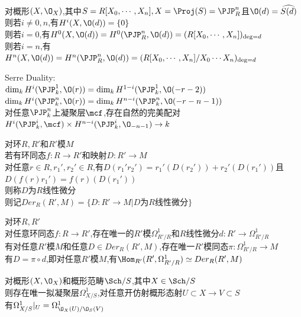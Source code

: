 \begin{dingli}
对概形$(X,\O_{X})$,其中$S=R[X_0,\cdots,X_n],X=\Proj(S)=\PJP^{n}_{R}$且$\O(d)=\widehat{S(d)}$\\
则若$i\neq 0,n$,有$H^{i}(X,\O(d))=\{0\}$\\
则若$i=0$,有$H^{0}(X,\O(d))=H^{0}(\PJP^{n}_{R},\O(d))=(R[X_0,\cdots,X_n])_{\deg=d}$\\
则若$i=n$,有$H^{n}(X,\O(d))=H^{n}(\PJP^{n}_{R},\O(d))=(R[X_0,\cdots,X_n]/X_0\cdots X_n)_{\deg=d}$
\end{dingli}

\begin{dingli}
Serre Duality:\\
$\dim_{k}H^{i}(\PJP^{1}_{k},\O(r))=\dim_{k}H^{1-i}(\PJP^{1}_{k},\O(-r-2))$\\
$\dim_{k}H^{i}(\PJP^{n}_{k},\O(r))=\dim_{k}H^{n-i}(\PJP^{n}_{k},\O(-r-n-1))$\\
对任意$\PJP^{n}_{k}$上凝聚层$\mcf$,存在自然的完美配对$H^{i}(\PJP^{i}_{k},\mcf)\times H^{n-i}(\PJP^{i}_{k},\O_{-n-1})\to k$
\end{dingli}

\begin{dingyi}
对环$R,R'$和$R'$模$M$\\
若有环同态$f:R\to R'$和映射$D:R'\to M$\\
对任意$r\in R,r_1',r_2'\in R$,有$D(r_1'r_2')=r_1'(D(r_2'))+r_2'(D(r_1'))$且$D(f(r)r_1')=f(r)(D(r_1'))$\\
则称$D$为$R$线性微分\\
则记$Der_{R}(R',M)=\{D:R'\to M|D\text{为}R\text{线性微分}\}$
\end{dingyi}

\begin{dingli}
对环$R,R'$\\
对任意环同态$f:R\to R'$,存在唯一的$R'$模$\Omega_{R'/R}^{1}$和$R$线性微分$d:R'\to \Omega_{R'/R}^{1}$\\
有对任意$R'$模$M$和任意$D\in Der_{R}(R',M)$,存在唯一$R'$模同态$\pi:\Omega_{R'/R}^{1}\to M$\\
有$D=\pi\circ d$,即对任意$R'$模$M$,有$\Hom_{R'}(R',\Omega_{R'/R}^{1})\simeq Der_{R}(R',M)$
\end{dingli}

\begin{dingli}
对概形$(X,\O_{X})$和概形范畴$\Sch/S$,其中$X\in \Sch/S$\\
则存在唯一拟凝聚层$\Omega_{X/S}^{1}$,对任意开仿射概形态射$U\subset X\to V\subset S$\\
有$\Omega_{X/S}^{1}|_{U}=\Omega_{\O_{X}(U)/\O_{S}(V)}^{1}$
\end{dingli}

